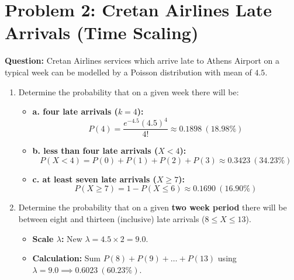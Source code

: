 \documentclass[11pt,a4paper]{article}
\begin{document}
\section*{Problem 2: Cretan Airlines Late Arrivals (Time Scaling)}
\textbf{Question:} Cretan Airlines services which arrive late to Athens Airport on a typical week can be modelled by a Poisson distribution with mean of $4.5$. 
\begin{enumerate}
    \item[a)] Determine the probability that on a given week there will be:
    \begin{itemize}
        \item \textbf{a. four late arrivals ($k=4$):} 
        $$P(4) = \frac{e^{-4.5}(4.5)^4}{4!} \approx \mathbf{0.1898} \ (18.98\%)$$
        \item \textbf{b. less than four late arrivals ($X < 4$):} 
        $$P(X < 4) = P(0) + P(1) + P(2) + P(3) \approx \mathbf{0.3423} \ (34.23\%)$$
        \item \textbf{c. at least seven late arrivals ($X \ge 7$):} 
        $$P(X \ge 7) = 1 - P(X \le 6) \approx \mathbf{0.1690} \ (16.90\%)$$
    \end{itemize}
    \item[b)] Determine the probability that on a given \textbf{two week period} there will be between eight and thirteen (inclusive) late arrivals ($8 \le X \le 13$).
    \begin{itemize}
        \item \textbf{Scale $\lambda$:} New $\lambda = 4.5 \times 2 = 9.0$.
        \item \textbf{Calculation:} Sum $P(8) + P(9) + \dots + P(13)$ using $\lambda = 9.0 \implies \mathbf{0.6023} \ (60.23\%)$.
    \end{itemize}
\end{enumerate}
\end{document}
